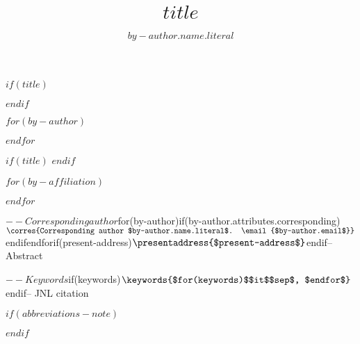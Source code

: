 $if(title)$
\title{$title$}
$endif$

$for(by-author)$
\author[$for(by-author.affiliations)$$it.number$$sep$,$endfor$]{$by-author.name.literal$}
$endfor$

$if(title)$
$endif$

$for(by-affiliation)$
\address[$it.number$]{,,}

$endfor$

$-- Corresponding author
$for(by-author)$
$if(by-author.attributes.corresponding)$\corres{Corresponding author $by-author.name.literal$. \email{$by-author.email$}}$endif$
$endfor$

$if(present-address)$
\presentaddress{$present-address$}
$endif$


$-- Abstract

$-- Keywords
$if(keywords)$
\keywords{$for(keywords)$$it$$sep$, $endfor$}
$endif$

$-- JNL citation

\maketitle

$if(abbreviations-note)$
\renewcommand\thefootnote{}

\renewcommand\thefootnote{\fnsymbol{footnote}}
\setcounter{footnote}{1}
$endif$